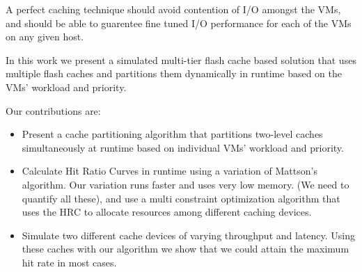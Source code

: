 A perfect caching technique should avoid contention of I/O amongst the VMs, and should be able to guarentee fine tuned I/O performance for each of the VMs on any given host.

In this work we present a simulated multi-tier flash cache based solution that uses multiple flash caches and partitions them dynamically in runtime based on the VMs' workload and priority.

Our contributions are:
\begin{itemize}
\item Present a cache partitioning algorithm that partitions two-level caches simultaneously at runtime based on individual VMs' workload and priority.
\item Calculate Hit Ratio Curves in runtime using a variation of Mattson's algorithm. Our variation runs faster and uses very low memory. (We need to quantify all these), and use a multi constraint optimization algorithm that uses the HRC to allocate resources among different caching devices.
\item Simulate two different cache devices of varying throughput and latency. Using these caches with our algorithm we show that we could attain the maximum hit rate in most cases.
\end{itemize}
